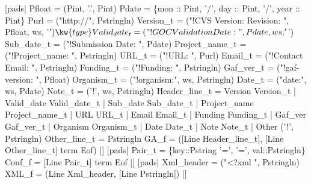 \begin{code}
[pads|
   Pfloat         = (Pint, '.', Pint)
   Pdate          = \{mon :: Pint, '/', day :: Pint, '/', year :: Pint\}
   Purl           = ("http://", Pstringln)
   Version_t      = ("!CVS Version: Revision: ", Pfloat, ws, '$')
  \kw{type} Valid_date_t   = ("!GOC Validation Date: ", Pdate, ws, '$')
   Sub_date_t     = ("!Submission Date: ", Pdate)
   Project_name_t = ("!Project_name: ", Pstringln)
   URL_t          = ("!URL: ", Purl)
   Email_t        = ("!Contact Email: ", Pstringln)
   Funding_t      = ("!Funding: ", Pstringln)
   Gaf_ver_t      = ("!gaf-version: ", Pfloat)
   Organism_t     = ("!organism:", ws, Pstringln)
   Date_t         = ("date:", ws, Pdate)
   Note_t         = ('!', ws, Pstringln)
\mbox{} 
   Header_line_t = 
	Version Version_t
	| Valid_date Valid_date_t
	| Sub_date Sub_date_t
	| Project_name Project_name_t
	| URL URL_t
	| Email Email_t
	| Funding Funding_t
	| Gaf_ver Gaf_ver_t
	| Organism Organism_t
	| Date Date_t
	| Note Note_t
	| Other ('!', Pstringln)
\mbox{} 
   Other_line_t = Pstringln
\mbox{} 
   GA_f = ([Line Header_line_t], [Line Other_line_t]  term Eof)
|]
\mbox{} 
[pads|
   Pair_t = \{key::Pstring '=', '=', val::Pstringln\}
   Conf_f = [Line Pair_t]  term Eof 
|]
\mbox{} 
[pads|
   Xml_header = ("<?xml ", Pstringln)
   XML_f = (Line Xml_header, [Line Pstringln])
|]
\end{code}

